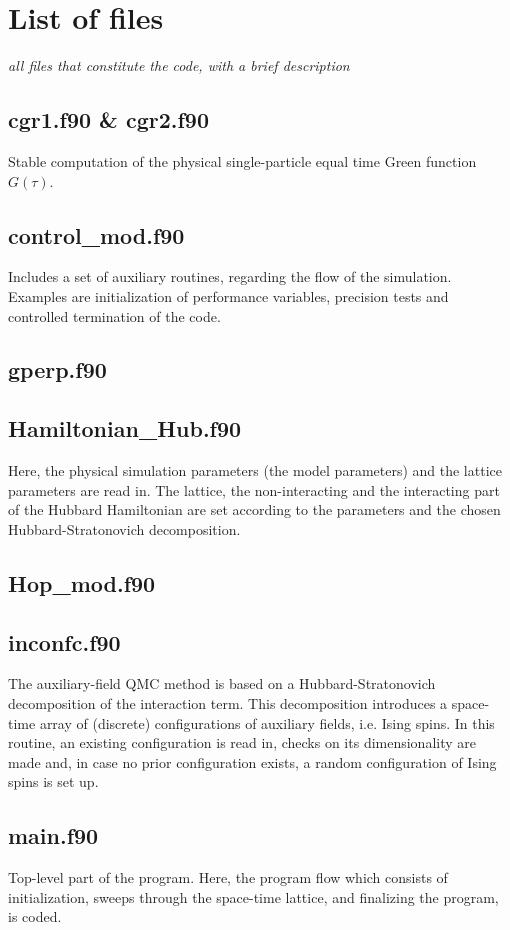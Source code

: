 \section{List of files}
\textit{all files that constitute the code, with a brief description}
\subsection{cgr1.f90 \& cgr2.f90}
Stable computation of the physical single-particle equal time Green function $G(\tau)$.
\subsection{control\_mod.f90}
Includes a set of auxiliary routines, regarding the flow of the simulation. 
Examples are initialization of performance variables, precision tests and controlled termination of the code.
\subsection{gperp.f90}
\subsection{Hamiltonian\_Hub.f90}
Here, the physical simulation parameters (the model parameters) and the lattice parameters are read in. 
The lattice, the non-interacting and the interacting part of the Hubbard Hamiltonian are set according to the parameters and the chosen Hubbard-Stratonovich decomposition.
\subsection{Hop\_mod.f90}
\subsection{inconfc.f90}
The auxiliary-field QMC method is based on a Hubbard-Stratonovich decomposition of the interaction term. This decomposition introduces a space-time array of (discrete) configurations of auxiliary fields, i.e. Ising spins. 
In this routine, an existing configuration is read in, checks on its dimensionality are made and, in case no prior configuration exists, a random configuration of Ising spins is set up.
\subsection{main.f90}
Top-level part of the program. Here, the program flow which consists of initialization, sweeps through the space-time lattice, and finalizing the program, is coded.
